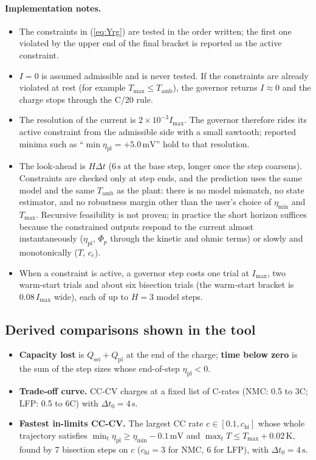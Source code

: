 \documentclass[11pt]{article}
\newcommand{\ce}{c_{e}}
\newcommand{\Tamb}{T_{\mathrm{amb}}}
\newcommand{\etapl}{\eta_{\mathrm{pl}}}
\newcommand{\unit}[1]{\,\mathrm{#1}}
\begin{document}
\paragraph{Implementation notes.}
\begin{itemize}[leftmargin=*]
\item The constraints in (\ref{eq:Yrg}) are tested in the order written; the first one violated by the upper end of the final bracket is reported as the active constraint.
\item $I=0$ is assumed admissible and is never tested. If the constraints are already violated at rest (for example $T_{\max}\le\Tamb$), the governor returns $I\approx0$ and the charge stops through the C/20 rule.
\item The resolution of the current is $2\times10^{-3}I_{\max}$. The governor therefore rides its active constraint from the admissible side with a small sawtooth; reported minima such as ``$\min\etapl=+5.0\unit{mV}$'' hold to that resolution.
\item The look-ahead is $H\Delta t$ ($6\unit{s}$ at the base step, longer once the step coarsens). Constraints are checked only at step ends, and the prediction uses the same model and the same $\Tamb$ as the plant: there is no model mismatch, no state estimator, and no robustness margin other than the user's choice of $\eta_{\min}$ and $T_{\max}$. Recursive feasibility is not proven; in practice the short horizon suffices because the constrained outputs respond to the current almost instantaneously ($\etapl$, $\Phi_p$ through the kinetic and ohmic terms) or slowly and monotonically ($T$, $\ce$).
\item When a constraint is active, a governor step costs one trial at $I_{\max}$, two warm-start trials and about six bisection trials (the warm-start bracket is $0.08\,I_{\max}$ wide), each of up to $H=3$ model steps.
\end{itemize}

\subsection{Derived comparisons shown in the tool}
\begin{itemize}[leftmargin=*]
\item \textbf{Capacity lost} is $Q_{\mathrm{sei}}+Q_{\mathrm{pl}}$ at the end of the charge; \textbf{time below zero} is the sum of the step sizes whose end-of-step $\etapl<0$.
\item \textbf{Trade-off curve.} CC-CV charges at a fixed list of C-rates (NMC: 0.5 to 3C; LFP: 0.5 to 6C) with $\Delta t_0=4\unit{s}$.
\item \textbf{Fastest in-limits CC-CV.} The largest CC rate $c\in[0.1,c_{\mathrm{hi}}]$ whose whole trajectory satisfies $\min_t\etapl\ge\eta_{\min}-0.1\unit{mV}$ and $\max_tT\le T_{\max}+0.02\unit{K}$, found by 7 bisection steps on $c$ ($c_{\mathrm{hi}}=3$ for NMC, 6 for LFP), with $\Delta t_0=4\unit{s}$.
\end{itemize}
\end{document}
